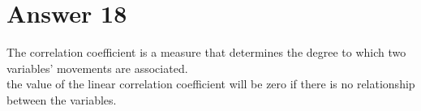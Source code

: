 \documentclass[12pt]{article}
\begin{document}
\section*{Answer 18}

The correlation coefficient is a measure that determines the degree to which two variables' movements are associated. \\
the value of the linear correlation coefficient will be zero if there is no relationship between the variables.
\end{document}
